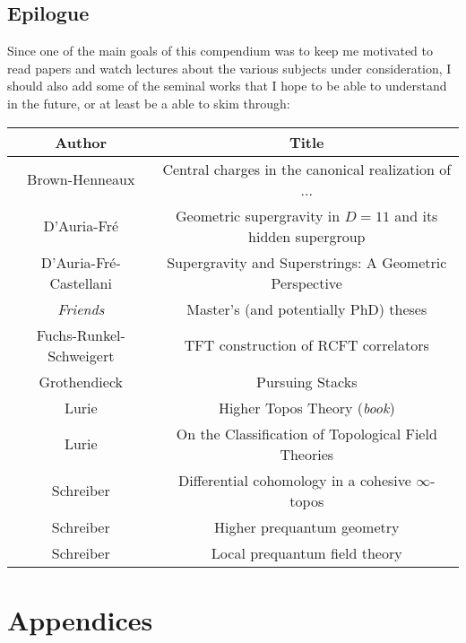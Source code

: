\documentclass[11pt, a4paper]{report}
\begin{document}
\chapter{Epilogue}

    Since one of the main goals of this compendium was to keep me motivated to read papers and watch lectures about the various subjects under consideration, I should also add some of the seminal works that I hope to be able to understand  in the future, or at least be a able to skim through:

    \begin{center}
        \begin{tabular}{|c|c|}
            \hline
            Author&Title\\
            \hline
            Brown-Henneaux&Central charges in the canonical realization of ...\\
			D'Auria-Fr\'e&Geometric supergravity in $D=11$ and its hidden supergroup\\
			D'Auria-Fr\'e-Castellani&Supergravity and Superstrings: A Geometric Perspective\\
            \textit{Friends}&Master's (and potentially PhD) theses\\
            Fuchs-Runkel-Schweigert&TFT construction of RCFT correlators\\
            Grothendieck&Pursuing Stacks\\
            Lurie&Higher Topos Theory (\textit{book})\\
            Lurie&On the Classification of Topological Field Theories\\
            Schreiber&Differential cohomology in a cohesive $\infty$-topos\\
            Schreiber&Higher prequantum geometry\\
            Schreiber&Local prequantum field theory\\
            \hline
        \end{tabular}
    \end{center}

\part{Appendices}
\begin{appendices}




\end{appendices}
\end{document}
